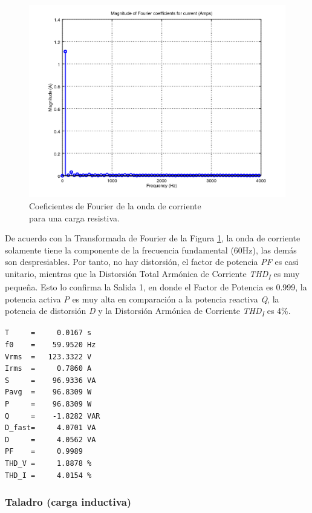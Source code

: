 \documentclass[journal]{IEEEtran}
\begin{document}
\begin{figure}[h]
\centering
\includegraphics[clip,width=0.9\columnwidth]
{zoomed_current_furier_coefficients_resistive.png}
\caption{Coeficientes de Fourier de la onda de corriente \\
para una carga resistiva.}
\label{fourier_corrent_coefficients_resistive}
\end{figure}

De acuerdo con la Transformada de Fourier de la Figura 
\ref{fourier_corrent_coefficients_resistive}, la onda 
de corriente solamente tiene la componente de la frecuencia 
fundamental (60Hz), las demás son despresiables. 
Por tanto, no hay distorsión, el factor de potencia 
\textit{PF} es casi unitario, mientras que la Distorsión 
Total Armónica de Corriente 
\textit{THD\textsubscript{I}} es muy pequeña. Esto lo 
confirma la Salida 1, en donde el Factor de Potencia es 
0.999, la potencia activa \textit{P} es muy alta en 
comparación a la potencia reactiva \textit{Q}, la 
potencia de distorsión \textit{D} 
y la Distorsión Armónica de Corriente 
\textit{THD\textsubscript{I}} es 4\%. 


\begin{lstlisting}[caption = Carga resistiva.]
T     =     0.0167 s 
f0    =    59.9520 Hz 
Vrms  =   123.3322 V
Irms  =     0.7860 A
S     =    96.9336 VA
Pavg  =    96.8309 W 
P     =    96.8309 W 
Q     =    -1.8282 VAR 
D_fast=     4.0701 VA 
D     =     4.0562 VA 
PF    =     0.9989 
THD_V =     1.8878 %
THD_I =     4.0154 %
\end{lstlisting}

\subsubsection{Taladro (carga inductiva)}
\end{document}
